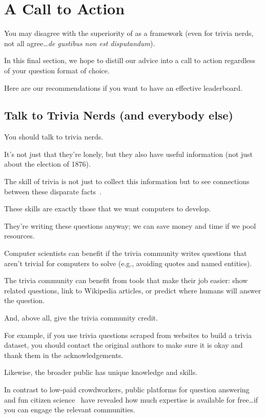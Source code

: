 
\section{A Call to Action}
\label{sec:call}



You may disagree with the superiority of \qb{} as a \qa{} framework (even for trivia nerds, not all agree\dots \textit{de gustibus non est disputandum}).

In this final section, we hope to distill our advice into a call to action regardless of your question format of choice.

Here are our recommendations if you want to have an effective leaderboard.

\subsection{Talk to Trivia Nerds (and everybody else)}

You should talk to trivia nerds.

It's not just that they're lonely, but they also have useful information (not just about the election of 1876).

The skill of trivia is not just to collect this information but to see connections between these disparate facts~\cite{jennings-06}.

These skills are exactly those that we want computers to develop.

They're writing these questions anyway; we can save money and time if we pool resources.

Computer scientists can benefit if the trivia community writes questions that aren't trivial for computers to solve (e.g., avoiding quotes and named entities).

The trivia community can benefit from tools that make their job easier: show related questions, link to Wikipedia articles, or predict where humans will answer the question.

And, above all, give the trivia community credit.

For example, if you use trivia questions scraped from websites to build a trivia \qa{} dataset, you should contact the original authors to make sure it is okay and thank them in the acknowledgements.  

Likewise, the broader public has unique knowledge and skills.

In contrast to low-paid crowdworkers, public platforms for question answering and fun citizen science~\cite{bowser-13} have revealed how much expertise is available for free\dots if you can engage the relevant communities.

